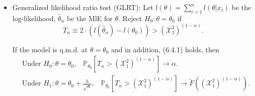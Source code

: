 \documentclass[a4paper]{article}
\begin{document}
\begin{itemize}[leftmargin=*]
	\item Generalized likelihood ratio test (GLRT): Let $l(\theta) = \sum\limits_{i=1}^n l(\theta | x_i)$ be the log-likelihood, $\hat{\theta}_n$ be the MlE for $\theta$. Reject $H_0: \theta = \theta_0$ if
	\begin{equation*}
		T_n \equiv 2 \cdot  \left(l(\hat{\theta}_n) - l(\theta_0)\right) > (\mathcal{X}_1^2)^{(1-\alpha)}.
	\end{equation*}
	
	\begin{prop}
		If the model is q.m.d. at $\theta = \theta_0$ and in addition, (6.4.1) holds, then
		\begin{equation*}
			\begin{aligned}
				& \text{Under $H_0: \theta = \theta_0$,} \quad \mathbb{P}_{\theta_0} \left[T_n > \left(\mathcal{X}_1^2\right)^{(1-\alpha)}\right] \to \alpha. \\
				& \text{Under $H_1: \theta = \theta_0 + \frac{h}{\sqrt{n}}$,} \quad\mathbb{P}_{\theta_0} \left[T_n > \left(\mathcal{X}_1^2\right)^{(1-\alpha)}\right] \to \tilde{F} \left(\left(\mathcal{X}_1^2\right)^{(1-\alpha)}\right). 
			\end{aligned}
		\end{equation*}
	\end{prop}


\end{itemize}
\end{document}
